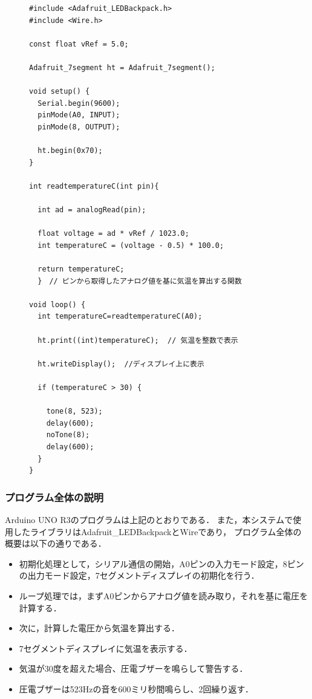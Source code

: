 \documentclass[uplatex,dvipdfmx]{jsarticle}
\begin{document}
\begin{figure}[H]
\centering
\begin{lstlisting}[firstnumber=1, caption=Arduino UNO R3のソースコード, label=code]
#include <Adafruit_LEDBackpack.h>
#include <Wire.h>

const float vRef = 5.0;

Adafruit_7segment ht = Adafruit_7segment();

void setup() {
  Serial.begin(9600);
  pinMode(A0, INPUT);
  pinMode(8, OUTPUT);

  ht.begin(0x70);  
}

int readtemperatureC(int pin){ 
  
  int ad = analogRead(pin);

  float voltage = ad * vRef / 1023.0;
  int temperatureC = (voltage - 0.5) * 100.0;
  
  return temperatureC;
  }　// ピンから取得したアナログ値を基に気温を算出する関数

void loop() {
  int temperatureC=readtemperatureC(A0);

  ht.print((int)temperatureC);  // 気温を整数で表示

  ht.writeDisplay();  //ディスプレイ上に表示
  
  if (temperatureC > 30) {
    
    tone(8, 523);
    delay(600);
    noTone(8);
    delay(600);
  }
}
\end{lstlisting}
\end{figure}

\subsubsection{プログラム全体の説明}
\indent
Arduino UNO R3のプログラムは上記のとおりである．
また，本システムで使用したライブラリはAdafruit\_LEDBackpackとWireであり，
プログラム全体の概要は以下の通りである．
\begin{itemize}
\item 初期化処理として，シリアル通信の開始，A0ピンの入力モード設定，8ピンの出力モード設定，7セグメントディスプレイの初期化を行う．
\item ループ処理では，まずA0ピンからアナログ値を読み取り，それを基に電圧を計算する．
\item 次に，計算した電圧から気温を算出する．
\item 7セグメントディスプレイに気温を表示する．
\item 気温が30度を超えた場合、圧電ブザーを鳴らして警告する．
\item 圧電ブザーは523Hzの音を600ミリ秒間鳴らし、2回繰り返す．
\end{itemize}
\end{document}

